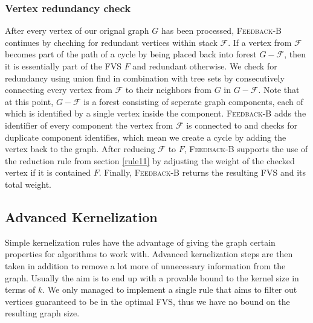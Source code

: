 \subsubsection{Vertex redundancy check}
After every vertex of our orignal graph $G$ has been processed, \textsc{Feedback-B} continues by cheching for redundant vertices within stack $\mathcal{F}$. If a vertex from $\mathcal{F}$ becomes part of the path of a cycle by being placed back into forest $G-\mathcal{F}$, then it is essentially part of the FVS $F$ and redundant otherwise. We check for redundancy using union find in combination with tree sets by consecutively connecting every vertex from $\mathcal{F}$ to their neighbors from $G$ in $G-\mathcal{F}$. Note that at this point, $G-\mathcal{F}$ is a forest consisting of seperate graph components, each of which is identified by a single vertex inside the component. \textsc{Feedback-B} adds the identifier of every component the vertex from $\mathcal{F}$ is connected to and checks for duplicate component identifies, which mean we create a cycle by adding the vertex back to the graph. After reducing  $\mathcal{F}$ to $F$, \textsc{Feedback-B} supports the use of the reduction rule from section \ref{rule11} by adjusting the weight of the checked vertex if it is contained $F$. Finally, \textsc{Feedback-B} returns the resulting FVS and its total weight.

\subsection{Advanced Kernelization}%
Simple kernelization rules have the advantage of giving the graph certain properties for algorithms to work with. Advanced kernelization steps are then taken in addition to remove a lot more of unnecessary information from the graph. Usually the aim is to end up with a provable bound to the kernel size in terms of $k$. We only managed to implement a single rule that aims to filter out vertices guaranteed to be in the optimal FVS, thus we have no bound on the resulting graph size. 
